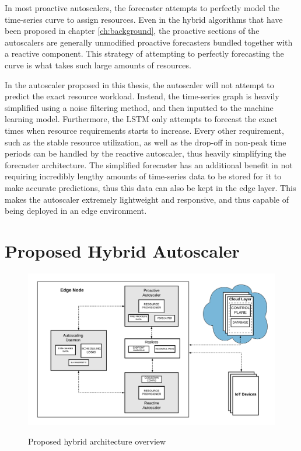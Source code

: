 In most proactive autoscalers, the forecaster attempts to perfectly model the time-series curve to assign resources. Even in the hybrid algorithms that have been proposed in chapter \ref{ch:background}, the proactive sections of the autoscalers are generally unmodified proactive forecasters bundled together with a reactive component. This strategy of attempting to perfectly forecasting the curve is what takes such large amounts of resources.\par

In the autoscaler proposed in this thesis, the autoscaler will not attempt to predict the exact resource workload. Instead, the time-series graph is heavily simplified using a noise filtering method, and then inputted to the machine learning model. Furthermore, the LSTM only attempts to forecast the exact times when resource requirements starts to increase. Every other requirement, such as the stable resource utilization, as well as the drop-off in non-peak time periods can be handled by the reactive autoscaler, thus heavily simplifying the forecaster architecture. The simplified forecaster has an additional benefit in not requiring incredibly lengthy amounts of time-series data to be stored for it to make accurate predictions, thus this data can also be kept in the edge layer. This makes the autoscaler extremely lightweight and responsive, and thus capable of being deployed in an edge environment.\par

\section{Proposed Hybrid Autoscaler}
\label{sec:ch3-hybrid-autoscale-overview} 

\begin{figure}[htb]
    \centering
    \caption{Proposed hybrid architecture overview}
    \includegraphics[width=1.0\linewidth]{Figures/Hybrid-Architecture-Overview.pdf}
    \label{fig:hybrid-arch-overview}
\end{figure}

